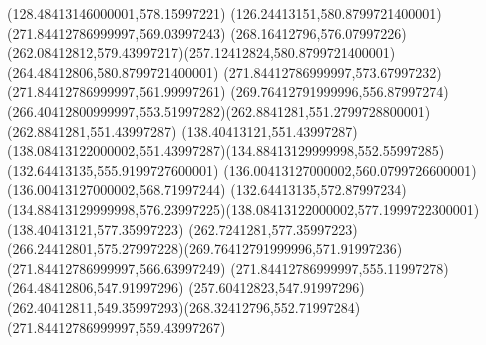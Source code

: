 {{	\lineto(128.48413146000001,578.15997221)
	\lineto(126.24413151,580.8799721400001)
	\closepath
	\moveto(271.84412786999997,569.03997243)
	\curveto(268.16412796,576.07997226)(262.08412812,579.43997217)(257.12412824,580.8799721400001)
	\lineto(264.48412806,580.8799721400001)
	\lineto(271.84412786999997,573.67997232)
	\closepath
	\moveto(271.84412786999997,561.99997261)
	\curveto(269.76412791999996,556.87997274)(266.40412800999997,553.51997282)(262.8841281,551.2799728800001)
	\lineto(262.8841281,551.43997287)
	\lineto(138.40413121,551.43997287)
	\curveto(138.08413122000002,551.43997287)(134.88413129999998,552.55997285)(132.64413135,555.9199727600001)
	\lineto(136.00413127000002,560.0799726600001)
	\lineto(136.00413127000002,568.71997244)
	\lineto(132.64413135,572.87997234)
	\curveto(134.88413129999998,576.23997225)(138.08413122000002,577.1999722300001)(138.40413121,577.35997223)
	\lineto(262.7241281,577.35997223)
	\curveto(266.24412801,575.27997228)(269.76412791999996,571.91997236)(271.84412786999997,566.63997249)
	\closepath
	\moveto(271.84412786999997,555.11997278)
	\lineto(264.48412806,547.91997296)
	\lineto(257.60412823,547.91997296)
	\curveto(262.40412811,549.35997293)(268.32412796,552.71997284)(271.84412786999997,559.43997267)
	\closepath
}
}
{
}


